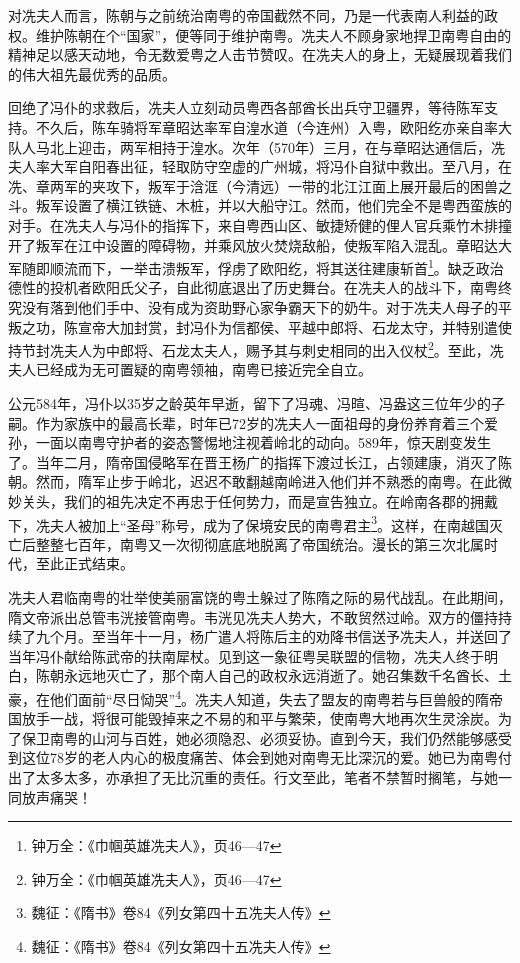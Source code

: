 对冼夫人而言，陈朝与之前统治南粤的帝国截然不同，乃是一代表南人利益的政权。维护陈朝在个“国家”，便等同于维护南粤。冼夫人不顾身家地捍卫南粤自由的精神足以感天动地，令无数爱粤之人击节赞叹。在冼夫人的身上，无疑展现着我们的伟大祖先最优秀的品质。

回绝了冯仆的求救后，冼夫人立刻动员粤西各部酋长出兵守卫疆界，等待陈军支持。不久后，陈车骑将军章昭达率军自湟水道（今连州）入粤，欧阳纥亦亲自率大队人马北上迎击，两军相持于湟水。次年（570年）三月，在与章昭达通信后，冼夫人率大军自阳春出征，轻取防守空虚的广州城，将冯仆自狱中救出。至八月，在冼、章两军的夹攻下，叛军于浛洭（今清远）一带的北江江面上展开最后的困兽之斗。叛军设置了横江铁链、木桩，并以大船守江。然而，他们完全不是粤西蛮族的对手。在冼夫人与冯仆的指挥下，来自粤西山区、敏捷矫健的俚人官兵乘竹木排撞开了叛军在江中设置的障碍物，并乘风放火焚烧敌船，使叛军陷入混乱。章昭达大军随即顺流而下，一举击溃叛军，俘虏了欧阳纥，将其送往建康斩首\footnote{钟万全：《巾帼英雄冼夫人》，页46—47}。缺乏政治德性的投机者欧阳氏父子，自此彻底退出了历史舞台。在冼夫人的战斗下，南粤终究没有落到他们手中、没有成为资助野心家争霸天下的奶牛。对于冼夫人母子的平叛之功，陈宣帝大加封赏，封冯仆为信都侯、平越中郎将、石龙太守，并特别遣使持节封冼夫人为中郎将、石龙太夫人，赐予其与刺史相同的出入仪杖\footnote{钟万全：《巾帼英雄冼夫人》，页46—47}。至此，冼夫人已经成为无可置疑的南粤领袖，南粤已接近完全自立。

公元584年，冯仆以35岁之龄英年早逝，留下了冯魂、冯暄、冯盎这三位年少的子嗣。作为家族中的最高长辈，时年已72岁的冼夫人一面祖母的身份养育着三个爱孙，一面以南粤守护者的姿态警惕地注视着岭北的动向。589年，惊天剧变发生了。当年二月，隋帝国侵略军在晋王杨广的指挥下渡过长江，占领建康，消灭了陈朝。然而，隋军止步于岭北，迟迟不敢翻越南岭进入他们并不熟悉的南粤。在此微妙关头，我们的祖先决定不再忠于任何势力，而是宣告独立。在岭南各郡的拥戴下，冼夫人被加上“圣母”称号，成为了保境安民的南粤君主\footnote{魏征：《隋书》卷84《列女第四十五冼夫人传》}。这样，在南越国灭亡后整整七百年，南粤又一次彻彻底底地脱离了帝国统治。漫长的第三次北属时代，至此正式结束。

冼夫人君临南粤的壮举使美丽富饶的粤土躲过了陈隋之际的易代战乱。在此期间，隋文帝派出总管韦洸接管南粤。韦洸见冼夫人势大，不敢贸然过岭。双方的僵持持续了九个月。至当年十一月，杨广遣人将陈后主的劝降书信送予冼夫人，并送回了当年冯仆献给陈武帝的扶南犀杖。见到这一象征粤吴联盟的信物，冼夫人终于明白，陈朝永远地灭亡了，那个南人自己的政权永远消逝了。她召集数千名酋长、土豪，在他们面前“尽日恸哭”\footnote{魏征：《隋书》卷84《列女第四十五冼夫人传》}。冼夫人知道，失去了盟友的南粤若与巨兽般的隋帝国放手一战，将很可能毁掉来之不易的和平与繁荣，使南粤大地再次生灵涂炭。为了保卫南粤的山河与百姓，她必须隐忍、必须妥协。直到今天，我们仍然能够感受到这位78岁的老人内心的极度痛苦、体会到她对南粤无比深沉的爱。她已为南粤付出了太多太多，亦承担了无比沉重的责任。行文至此，笔者不禁暂时搁笔，与她一同放声痛哭！

